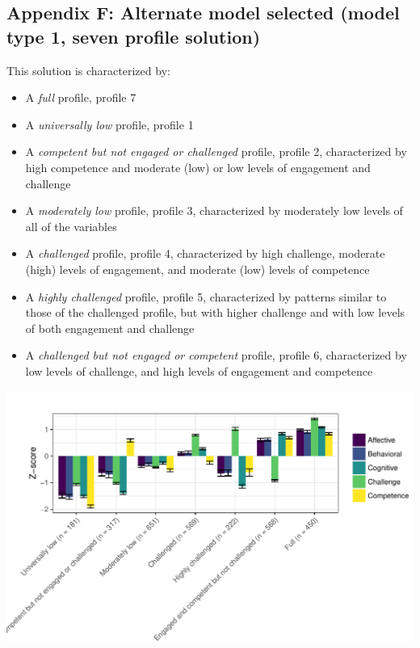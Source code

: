 \documentclass[]{msu-thesis}
\providecommand{\tightlist}{%
  \setlength{\itemsep}{0pt}\setlength{\parskip}{0pt}}
\theoremstyle{definition}
\theoremstyle{definition}
\theoremstyle{definition}
\theoremstyle{remark}
\begin{document}
\subsection{Appendix F: Alternate model selected (model type 1, seven
profile
solution)}\label{appendix-f-alternate-model-selected-model-type-1-seven-profile-solution}

This solution is characterized by:

\begin{itemize}
\tightlist
\item
  A \emph{full} profile, profile 7
\item
  A \emph{universally low} profile, profile 1
\item
  A \emph{competent but not engaged or challenged} profile, profile 2,
  characterized by high competence and moderate (low) or low levels of
  engagement and challenge
\item
  A \emph{moderately low} profile, profile 3, characterized by
  moderately low levels of all of the variables
\item
  A \emph{challenged} profile, profile 4, characterized by high
  challenge, moderate (high) levels of engagement, and moderate (low)
  levels of competence
\item
  A \emph{highly challenged} profile, profile 5, characterized by
  patterns similar to those of the challenged profile, but with higher
  challenge and with low levels of both engagement and challenge
\item
  A \emph{challenged but not engaged or competent} profile, profile 6,
  characterized by low levels of challenge, and high levels of
  engagement and competence
\end{itemize}

\begin{center}\includegraphics[width=0.9\linewidth]{rosenberg-dissertation_files/figure-latex/m1_7p-1} \end{center}
\end{document}
